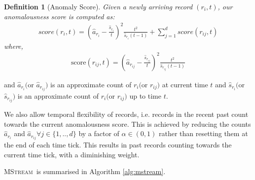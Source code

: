 \documentclass[sigconf]{acmart}
\newtheorem{definition}{Definition}
\newcommand{\method}{\textsc{MStream}}
\begin{document}
\begin{definition}[Anomaly Score]
Given a newly arriving record $(r_{i},t)$, our anomalousness score is computed as:
\begin{align}
score (r_{i},t) = \left(\hat{a}_{r_{i}} - \frac{\hat{s}_{r_{i}}}{t}\right)^2 \frac{t^2}{\hat{s}_{r_{i}}(t-1)} + \sum_{j=1}^{d} score(r_{ij},t)
\end{align}
where,
\begin{align}
\text{score}(r_{ij},t) = \left(\hat{a}_{r_{ij}} - \frac{\hat{s}_{r_{ij}}}{t}\right)^2 \frac{t^2}{\hat{s}_{r_{ij}}(t-1)}
\end{align}
\end{definition}
and $\hat{a}_{r_{i}} ($or $\hat{a}_{r_{ij}})$ is an approximate count of  $r_{i} ($or $r_{ij})$ at current time $t$ and $\hat{s}_{r_{i}} ($or $\hat{s}_{r_{ij}})$ is an approximate count of $r_{i} ($or $r_{ij})$ up to time $t$.

We also allow temporal flexibility of records, i.e. records in the recent past count towards the current anomalousness score. This is achieved by reducing the counts $\hat{a}_{r_{i}}$ and $\hat{a}_{r_{ij}} \forall j \in \{1,..,d\}$ by a factor of $\alpha \in (0, 1)$ rather than resetting them at the end of each time tick. This results in past records counting towards the current time tick, with a diminishing weight.

\method\ is summarised in Algorithm \ref{alg:mstream}.
\end{document}
